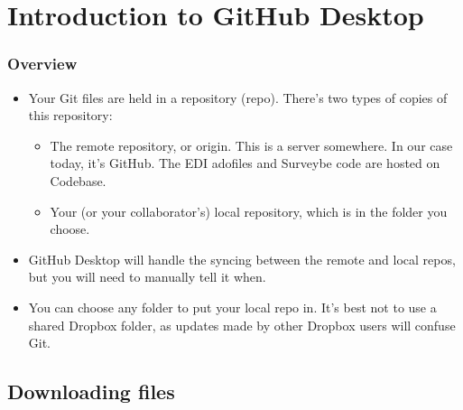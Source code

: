 \documentclass{beamer}
\begin{document}
\section{Introduction to GitHub Desktop}
\begin{frame}
\frametitle{Overview}
	\begin{itemize}
		\item Your Git files are held in a repository (repo). There's two types of copies of this repository:
		\begin{itemize}
			\item The remote repository, or origin. This is a server somewhere. In our case today, it's GitHub. The
			EDI adofiles and Surveybe code are hosted on Codebase.
			\item Your (or your collaborator's) local repository, which is in the folder you choose.
		\end{itemize}
		\item GitHub Desktop will handle the syncing between the remote and local repos, but you will need to manually tell it when.
		\item You can choose any folder to put your local repo in. It's best not to use a shared 
				Dropbox folder, as updates made by other Dropbox users will confuse Git.	
	\end{itemize}
\end{frame}

\subsection{Downloading files}
\end{document}

